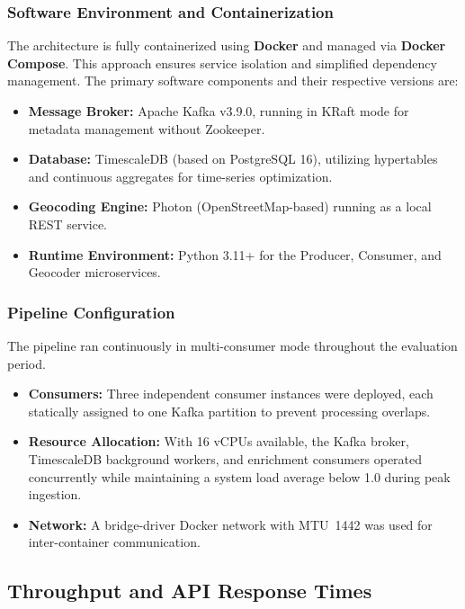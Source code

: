 \documentclass[sigconf]{acmart}
\begin{document}
\subsubsection{Software Environment and Containerization}
The architecture is fully containerized using \textbf{Docker} and managed via \textbf{Docker Compose}. This approach ensures service isolation and simplified dependency management. The primary software components and their respective versions are:

\begin{itemize}
    \item \textbf{Message Broker:} Apache Kafka v3.9.0, running in KRaft mode for metadata management without Zookeeper.
    \item \textbf{Database:} TimescaleDB (based on PostgreSQL 16), utilizing hypertables and continuous aggregates for time-series optimization.
    \item \textbf{Geocoding Engine:} Photon (OpenStreetMap-based) running as a local REST service.
    \item \textbf{Runtime Environment:} Python 3.11+ for the Producer, Consumer, and Geocoder microservices.
\end{itemize}

\subsubsection{Pipeline Configuration}
The pipeline ran continuously in multi-consumer mode throughout the evaluation period.
\begin{itemize}
    \item \textbf{Consumers:} Three independent consumer instances were deployed, each statically assigned to one Kafka partition to prevent processing overlaps.
    \item \textbf{Resource Allocation:} With 16 vCPUs available, the Kafka broker, TimescaleDB background workers, and enrichment consumers operated concurrently while maintaining a system load average below 1.0 during peak ingestion.
    \item \textbf{Network:} A bridge-driver Docker network with MTU~1442 was used for inter-container communication.
\end{itemize}

\subsection{Throughput and API Response Times}
\end{document}

